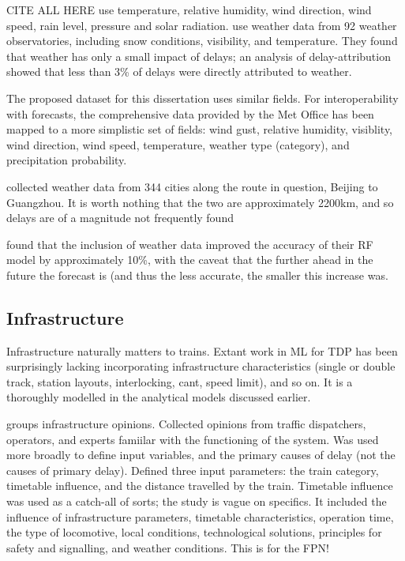 \documentclass{article}
\begin{document}
 \cite{oneto_et_al_2016} CITE ALL HERE use temperature, relative humidity, wind direction, wind speed, rain level, pressure and solar radiation.
\cite{nair_et_al_2019} use weather data from 92 weather observatories, including snow conditions, visibility, and temperature. They found that weather has only a small impact of delays; an analysis of delay-attribution showed that less than 3\% of delays were directly attributed to weather. 

The proposed dataset for this dissertation uses similar fields. For interoperability with forecasts, the comprehensive data provided by the Met Office has been mapped to a more simplistic set of fields: wind gust, relative humidity, visiblity, wind direction, wind speed, temperature, weather type (category), and precipitation probability. 

\cite{wang_et_al_2018} collected weather data from 344 cities along the route in question, Beijing to Guangzhou. It is worth nothing that the two are approximately 2200km, and so delays are of a magnitude not frequently found

\cite{oneto_et_al_2016} found that the inclusion of weather data improved the accuracy of their RF model by approximately 10\%, with the caveat that the further ahead in the future the forecast is (and thus the less accurate, the smaller this increase was. 


\subsection{Infrastructure}

Infrastructure naturally matters to trains. Extant work in ML for TDP has been surprisingly lacking incorporating infrastructure characteristics (single or double track, station layouts, interlocking, cant, speed limit), and so on. It is a thoroughly modelled in the analytical models discussed earlier.

\cite{milinkovic_et_al_2013} groups infrastructure opinions. Collected opinions from traffic dispatchers, operators, and experts famiilar with the functioning of the system. Was used more broadly to define input variables, and the primary causes of delay (not the causes of primary delay). Defined three input parameters: the train category, timetable influence, and the distance travelled by the train. Timetable influence was used as a catch-all of sorts; the study is vague on specifics. It included the influence of infrastructure parameters, timetable characteristics, operation time, the type of locomotive, local conditions, technological solutions, principles for safety and signalling, and weather conditions. This is for the FPN!
\end{document}
